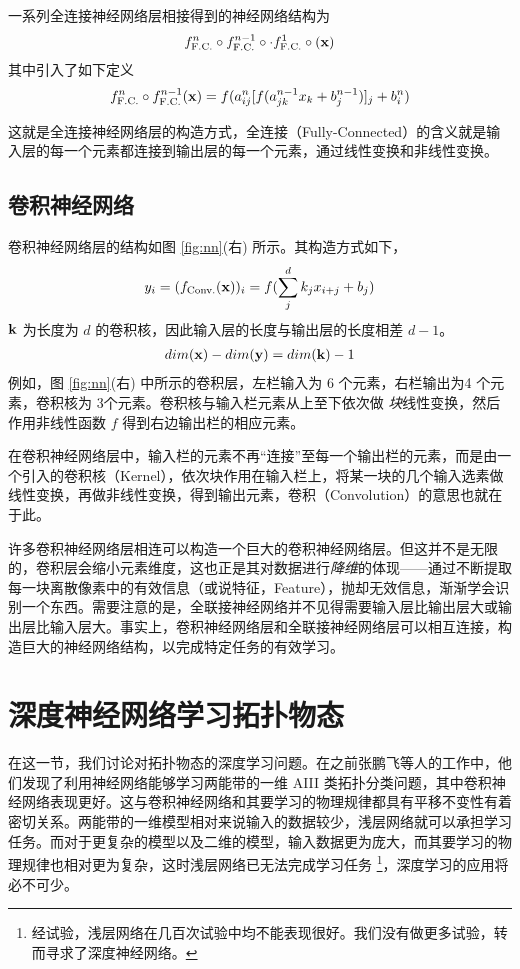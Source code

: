 一系列全连接神经网络层相接得到的神经网络结构为
\begin{align}
f_{\text{F.C.}}^n\circ f_{\text{F.C.}}^{n-1}\circ \cdot f_{\text{F.C.}}^1\circ(\mathbf{x})
\end{align}
其中引入了如下定义
\begin{align}
f_{\text{F.C.}}^{n}\circ f_{\text{F.C.}}^{n-1}(\mathbf{x})
= f(a^{n}_{ij}[f(a^{n-1}_{jk}x_k + b^{n-1}_j)]_{j} + b^n_i)
\end{align}

这就是全连接神经网络层的构造方式，全连接（Fully-Connected）的含义就是输入层的每一个元素都连接到输出层的每一个元素，通过线性变换和非线性变换。




\subsection{卷积神经网络}
卷积神经网络层的结构如图 \ref{fig:nn}(右) 所示。其构造方式如下，
\begin{align}
y_i = (f_{\text{Conv.}}(\mathbf{x}))_i = f(\sum_j^{d}k_jx_{i+j}+b_j)
\end{align}
$\mathbf{k}$ 为长度为 $d$ 的卷积核，因此输入层的长度与输出层的长度相差 $d-1$。
\begin{align}
dim(\mathbf{x}) - dim(\mathbf{y}) = dim(\mathbf{k}) - 1
\end{align}
例如，图 \ref{fig:nn}(右) 中所示的卷积层，左栏输入为 6 个元素，右栏输出为4 个元素，卷积核为 3个元素。卷积核与输入栏元素从上至下依次做 \textit{块}线性变换，然后作用非线性函数 $f$ 得到右边输出栏的相应元素。

在卷积神经网络层中，输入栏的元素不再“连接”至每一个输出栏的元素，而是由一个引入的卷积核（Kernel），依次块作用在输入栏上，将某一块的几个输入选素做线性变换，再做非线性变换，得到输出元素，卷积（Convolution）的意思也就在于此。

许多卷积神经网络层相连可以构造一个巨大的卷积神经网络层。但这并不是无限的，卷积层会缩小元素维度，这也正是其对数据进行\textit{降维}的体现——通过不断提取每一块离散像素中的有效信息（或说特征，Feature），抛却无效信息，渐渐学会识别一个东西。需要注意的是，全联接神经网络并不见得需要输入层比输出层大或输出层比输入层大。事实上，卷积神经网络层和全联接神经网络层可以相互连接，构造巨大的神经网络结构，以完成特定任务的有效学习。




\section{深度神经网络学习拓扑物态} \label{sec:topoml}
在这一节，我们讨论对拓扑物态的深度学习问题。在之前张鹏飞等人的工作中，他们发现了利用神经网络能够学习两能带的一维 AIII 类拓扑分类问题，其中卷积神经网络表现更好。这与卷积神经网络和其要学习的物理规律都具有平移不变性有着密切关系。两能带的一维模型相对来说输入的数据较少，浅层网络就可以承担学习任务。而对于更复杂的模型以及二维的模型，输入数据更为庞大，而其要学习的物理规律也相对更为复杂，这时浅层网络已无法完成学习任务
\footnote{经试验，浅层网络在几百次试验中均不能表现很好。我们没有做更多试验，转而寻求了深度神经网络。}，深度学习的应用将必不可少。



